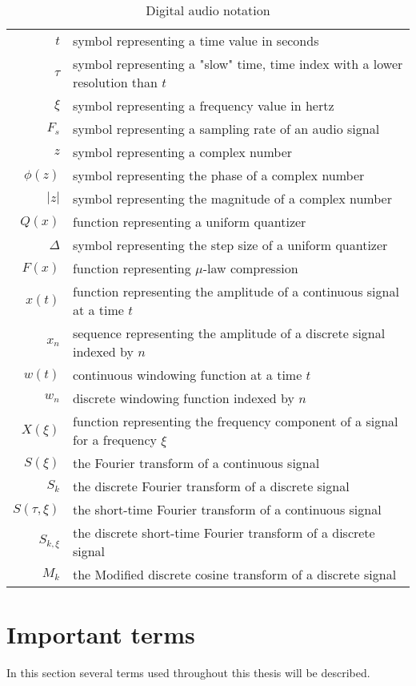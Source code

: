 \begin{table}[htbp]\caption{Digital audio notation}
	\label{tab:audio_notation}
	\begin{tabular}{r l}
		$t$ & symbol representing a time value in seconds \\
		$\tau$ & symbol representing a "slow" time, time index with a lower resolution than $t$ \\
		$\xi$ & symbol representing a frequency value in hertz \\
		$F_s$ & symbol representing a sampling rate of an audio signal \\
		$z$ & symbol representing a complex number \\
		$\phi(z)$ & symbol representing the phase of a complex number \\
		$|z|$ & symbol representing the magnitude of a complex number \\
		$Q(x)$ & function representing a uniform quantizer \\
		$\Delta$ & symbol representing the step size of a uniform quantizer \\
		$F(x)$ & function representing $\mu$-law compression \\
		$x(t)$ & function representing the amplitude of a continuous signal at a time $t$ \\
		$x_n$ & sequence representing the amplitude of a discrete signal indexed by $n$ \\
		$w(t)$ & continuous windowing function at a time $t$ \\
		$w_n$ & discrete windowing function indexed by $n$ \\
		$X(\xi)$ & function representing the frequency component of a signal for a frequency $\xi$ \\
		$S(\xi)$ & the Fourier transform of a continuous signal \\
		$S_k$ & the discrete Fourier transform of a discrete signal \\
		$S(\tau, \xi)$ & the short-time Fourier transform of a continuous signal \\
		$S_{k, \xi}$ & the discrete short-time Fourier transform of a discrete signal \\
		$M_k$ & the Modified discrete cosine transform of a discrete signal
	\end{tabular}
\end{table}

\section{Important terms}
In this section several terms used throughout this thesis will be described.

